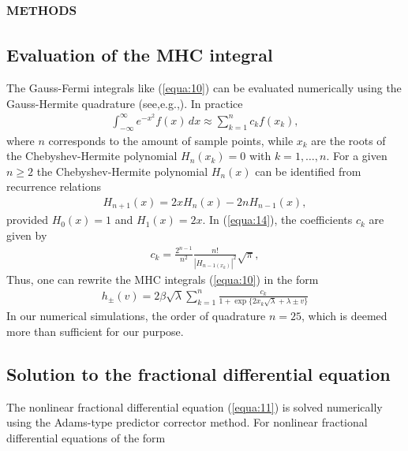 \documentclass[10pt]{article}
\begin{document}
\begin{multicols}{2}
{        \section{\scshape methods}
        }
        {\centering \subsection{Evaluation of the MHC integral}}
        The Gauss-Fermi integrals like (\ref{equa:10}) can be evaluated numerically using the Gauss-Hermite quadrature (see,e.g.,). In practice
        \begin{align}
            \int_{- \infty}^\infty e^{-x^2} f(x) \,dx \approx \sum_{k=1}^n c_k f(x_k), \label{equa:14}
        \end{align}
        where $n$ corresponds to the amount of sample points, while $x_k$ are the roots of the Chebyshev-Hermite polynomial $H_n (x_k) = 0$ with $k=1,\dots,n$. For a given $n \ge 2$ the Chebyshev-Hermite polynomial $H_n (x)$ can be identified from recurrence relations
        \begin{align}
            H_{n+1}(x) = 2xH_n(x) - 2nH_{n-1}(x), \label{equa:15}
        \end{align}
        provided $H_0(x)=1$ and $H_1(x) = 2x$. In (\ref{equa:14}), the coefficients $c_k$ are given by
        \begin{align}
            c_k = \frac{2^{n-1}}{n^2} \frac{n!}{|H_{n-1 (x_k)}|^2} \sqrt{\pi}, \label{equa:16}
        \end{align}
        Thus, one can rewrite the MHC integrals (\ref{equa:10}) in the form
        \begin{align}
            h_\pm (v) = 2 \beta \sqrt{\lambda} \sum_{k=1}^n \frac{c_k}{1 + \exp{ \{2x_k \sqrt{\lambda} + \lambda \pm v}\}} \label{equa:17}
        \end{align}
        In our numerical simulations, the order of quadrature $n = 25$, which is deemed more than sufficient for our purpose.
        \medskip
        \par
        {\centering \subsection{Solution to the fractional differential equation}}
        \bigskip
        The nonlinear fractional differential equation (\ref{equa:11}) is solved numerically using the Adams-type predictor corrector method. For nonlinear fractional differential equations of the form
        \begin{align}

\end{align}
\end{multicols}
\end{document}
